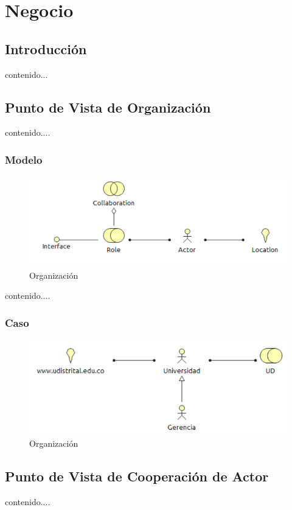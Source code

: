 \chapter{Negocio}
\section{Introducción}
contenido...
\newpage
\section{Punto de Vista de Organización}
contenido....
\subsection{Modelo}
\begin{figure}[th!]
	\centering
	\includegraphics[width=0.8\linewidth]{arquitectura_diseno/imgs/M_Organizacion}
	\caption{Organización}
\end{figure}
\newpage
contenido....
\subsection{Caso}
\begin{figure}[th!]
	\centering
	\includegraphics[width=0.8\linewidth]{arquitectura_diseno/imgs/C_Organizacion}
	\caption{Organización}
\end{figure}
\newpage
\section{Punto de Vista de Cooperación de Actor}
contenido....
